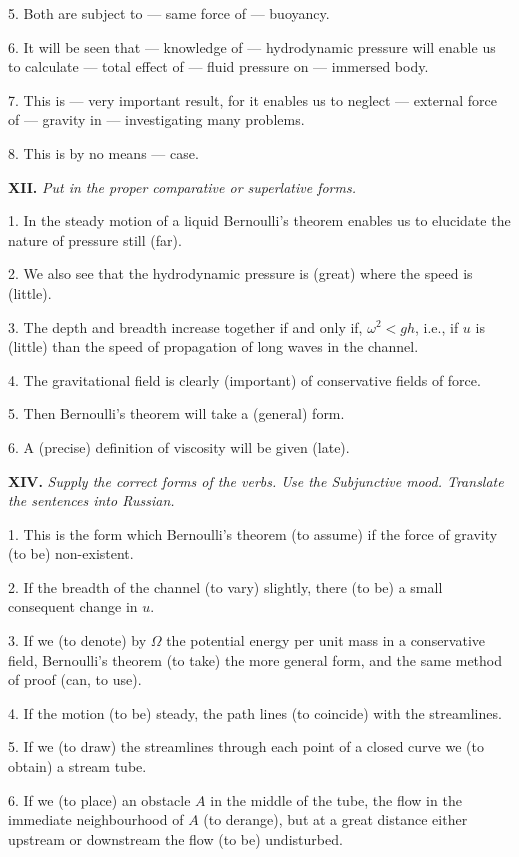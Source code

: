 \documentclass[a4paper]{article}
\newcommand{\ETask}[2]{\medskip\par\textbf{#1.} \textit{#2}\par}
\begin{document}
5. Both are subject to --- same force of --- buoyancy.

6. It will be seen that --- knowledge of --- hydrodynamic pressure will enable us to calculate --- total effect of --- fluid
pressure on --- immersed body.

7. This is --- very important result, for it enables us to neglect --- external force of --- gravity in --- investigating many problems.

8. This is by no means --- case.

\ETask{XII}{Put in the proper comparative or superlative forms.}

1. In the steady motion of a liquid Bernoulli's theorem enables us to elucidate the nature of pressure still (far).

2. We also see that the hydrodynamic pressure is (great) where the speed is (little).

3. The depth and breadth increase together if and only if, $\omega^2<gh$, i.e., if $u$ is (little) than the speed of
propagation of long waves in the channel.

4. The gravitational field is clearly (important) of conservative fields of force.

5. Then Bernoulli's theorem will take a (general) form.

6. A (precise) definition of viscosity will be given (late).

\ETask{XIV}{Supply the correct forms of the verbs. Use the Subjunctive mood. Translate the sentences into Russian.}
1. This is the form which Bernoulli's theorem (to assume) if the force of gravity (to be) non-existent.

2. If the breadth of the channel (to vary) slightly, there (to be) a small consequent change in $u$.

3. If we (to denote) by $\Omega$ the potential energy per unit mass in a conservative field, Bernoulli's theorem (to take)
the more general form, and the same method of proof (can, to use).

4. If the motion (to be) steady, the path lines (to coincide) with the streamlines.

5. If we (to draw) the streamlines through each point of a closed curve we (to obtain) a stream tube.

6. If we (to place) an obstacle $A$ in the middle of the tube, the flow in the immediate neighbourhood of $A$ (to derange),
but at a great distance either upstream or downstream the flow (to be) undisturbed.
\end{document}
